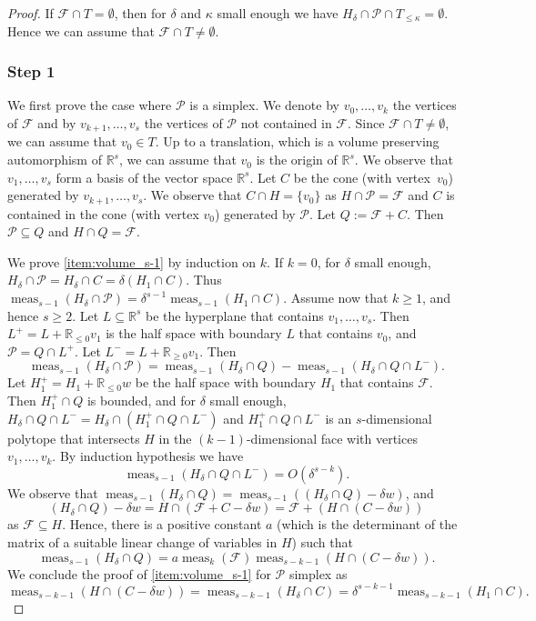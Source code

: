 \documentclass[JEP,XML,SOM,Unicode,published]{cedram}
\newcommand\RR{\mathbb{R}}
\DeclareMathOperator{\meas}{meas}
\theoremstyle{definition}
\numberwithin{theorem}{section}
\begin{document}
\begin{proof}
If $\mathcal F\cap T=\emptyset$,
then for $\delta$ and $\kappa$ small enough we have
$H_\delta \cap \mathcal P \cap T_{\leq\kappa}=\emptyset$.
Hence we can assume that $\mathcal F\cap T\neq\emptyset$.

\subsubsection*{Step 1}
We first prove the case where $\mathcal P$ is a simplex.
We denote by $v_0, \dots, v_k$
the vertices of $\mathcal F$ and by $v_{k+1},\dots, v_s$ the vertices of $\mathcal P$
not contained in $\mathcal F$. Since $\mathcal F\cap T\neq\emptyset$, we can assume that $v_0\in T$.
Up to a translation, which is a volume preserving automorphism of $\RR^s$,
we can assume that $v_0$ is the origin of $\RR^s$.
We observe that $v_1,\dots, v_s$ form a basis of the vector space $\RR^s$.
Let $C$ be the cone (with vertex~$v_0$) generated by $v_{k+1},\dots, v_s$.
We observe that $C\cap H=\{v_0\}$ as $H\cap \mathcal P=\mathcal F$ and $C$
is contained in the cone (with vertex $v_0$) generated by $\mathcal P$.
Let $Q:= \mathcal F+ C$. Then $\mathcal P\subseteq Q$ and $H\cap Q=\mathcal F$.

We prove \eqref{item:volume_s-1} by induction on $k$. If $k=0$,
for $\delta$ small enough, $H_\delta\cap\mathcal P=H_\delta\cap C=\delta(H_1\cap C)$.
Thus $\meas_{s-1}(H_\delta\cap\mathcal P)=\delta^{s-1}\meas_{s-1}(H_1\cap C)$.
Assume now that $k\geq 1$, and hence $s\geq 2$.
Let $L\subseteq \RR^s$ be the hyperplane that contains $v_1,\dots,v_s$.
Then $L^+=L+\RR_{\leq 0} v_1$ is the half space with boundary $L$ that contains $v_0$,
and $\mathcal P=Q\cap L^+$. Let $L^-=L+\RR_{\geq 0} v_1$.
Then
\[
\meas_{s-1}(H_\delta\cap\mathcal P)
=\meas_{s-1}(H_\delta\cap Q)-\meas_{s-1}(H_\delta\cap Q\cap L^-).
\]
Let $H_1^+=H_{1}+\RR_{\leq 0}w$ be the half space with boundary $H_1$ that contains $\mathcal F$.
Then $H_1^+\cap Q$ is bounded, and for $\delta$ small enough,
$H_\delta\cap Q\cap L^-=H_\delta\cap (H_1^+\cap Q\cap L^-)$
and $H_1^+\cap Q\cap L^-$ is an $s$-dimensional polytope that intersects $H$
in the $(k-1)$-dimensional face with vertices $v_1,\dots,v_k$.
By induction hypothesis we have
\begin{equation*}
\label{eq:volume:Qcap L^-}
\meas_{s-1}(H_\delta\cap Q\cap L^-)=O(\delta^{s-k}).
\end{equation*}
We observe that $\meas_{s-1}(H_\delta\cap Q)=\meas_{s-1}((H_\delta\cap Q)-\delta w)$, and
\[
(H_\delta\cap Q)-\delta w=H\cap (\mathcal F+C-\delta w)=\mathcal F+(H\cap (C-\delta w))
\]
as $\mathcal F\subseteq H$.
Hence, there is a positive constant $a$ (which is the determinant of the matrix of a
suitable linear change of variables in $H$) such that
\[
\meas_{s-1}(H_\delta\cap Q)=a\meas_k(\mathcal F)\meas_{s-k-1}(H\cap (C-\delta w)).
\]
We conclude the proof of \eqref{item:volume_s-1} for $\mathcal P$ simplex as
\[
\meas_{s-k-1}(H\cap (C-\delta w))
=\meas_{s-k-1}(H_\delta\cap C)=\delta^{s-k-1}\meas_{s-k-1}(H_1\cap C).
\]


\end{proof}
\end{document}

